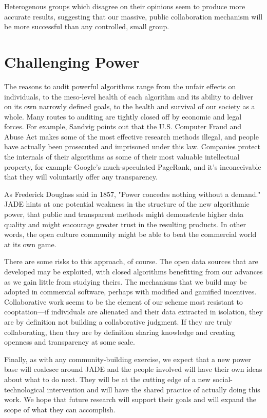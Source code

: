 \documentclass{sigchi-ext}
\begin{document}
Heterogenous groups which disagree on their opinions seem to produce more accurate results, suggesting that our massive, public collaboration mechanism will be more successful than any controlled, small group.\cite{schulz2006group}

\section{Challenging Power}

The reasons to audit powerful algorithms range from the unfair effects on individuals, to the meso-level health of each algorithm and its ability to deliver on its own narrowly defined goals, to the health and survival of our society as a whole.  Many routes to auditing are tightly closed off by economic and legal forces.  For example, Sandvig points out that the U.S. Computer Fraud and Abuse Act makes some of the most effective research methods illegal, and people have actually been prosecuted and imprisoned under this law.  Companies protect the internals of their algorithms as some of their most valuable intellectual property, for example Google's much-speculated PageRank, and it's inconceivable that they will voluntarily offer any transparency.

As Frederick Douglass said in 1857, "Power concedes nothing without a demand."  JADE hints at one potential weakness in the structure of the new algorithmic power, that public and transparent methods might demonstrate higher data quality and might encourage greater trust in the resulting products.  In other words, the open culture community might be able to beat the commercial world at its own game.

There are some risks to this approach, of course.  The open data sources that are developed may be exploited, with closed algorithms benefitting from our advances as we gain little from studying theirs.  The mechanisms that we build may be adopted in commercial software, perhaps with modified and gamified incentives.  Collaborative work seems to be the element of our scheme most resistant to cooptation---if individuals are alienated and their data extracted in isolation, they are by definition not building a collaborative judgment.  If they are truly collaborating, then they are by definition sharing knowledge and creating openness and transparency at some scale.

Finally, as with any community-building exercise, we expect that a new power base will coalesce around JADE and the people involved will have their own ideas about what to do next.  They will be at the cutting edge of a new social-technological intervention and will have the shared practice of actually doing this work.  We hope that future research will support their goals and will expand the scope of what they can accomplish.

\balance{}



\end{document}
